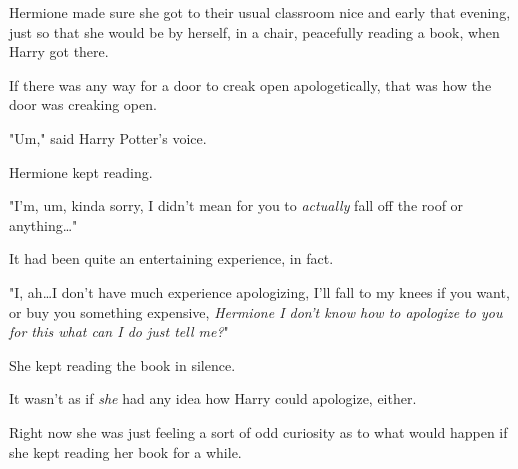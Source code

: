 Hermione made sure she got to their usual classroom nice and early that
evening, just so that she would be by herself, in a chair, peacefully reading a
book, when Harry got there.

If there was any way for a door to creak open apologetically, that was how the
door was creaking open.

"Um," said Harry Potter's voice.

Hermione kept reading.

"I'm, um, kinda sorry, I didn't mean for you to \emph{actually} fall off the
roof or anything…"

It had been quite an entertaining experience, in fact.

"I, ah…I don't have much experience apologizing, I'll fall to my knees
if you want, or buy you something expensive, \emph{Hermione I don't know how to
apologize to you for this what can I do just tell me?}"

She kept reading the book in silence.

It wasn't as if \emph{she} had any idea how Harry could apologize, either.

Right now she was just feeling a sort of odd curiosity as to what would happen
if she kept reading her book for a while.
